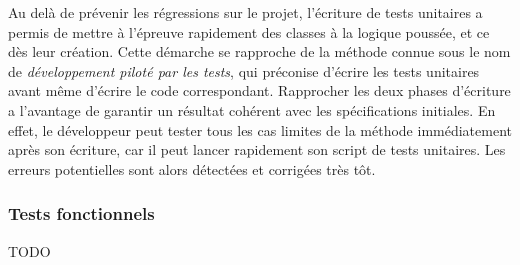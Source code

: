 Au delà de prévenir les régressions sur le projet, l'écriture de tests unitaires a permis de mettre à l'épreuve rapidement des classes à la logique poussée, et ce dès leur création. Cette démarche se rapproche de la méthode connue sous le nom de \emph{développement piloté par les tests}, qui préconise d'écrire les tests unitaires avant même d'écrire le code correspondant. Rapprocher les deux phases d'écriture a l'avantage de garantir un résultat cohérent avec les spécifications initiales. En effet, le développeur peut tester tous les cas limites de la méthode immédiatement après son écriture, car il peut lancer rapidement son script de tests unitaires. Les erreurs potentielles sont alors détectées et corrigées très tôt.


\subsubsection{Tests fonctionnels}

TODO
